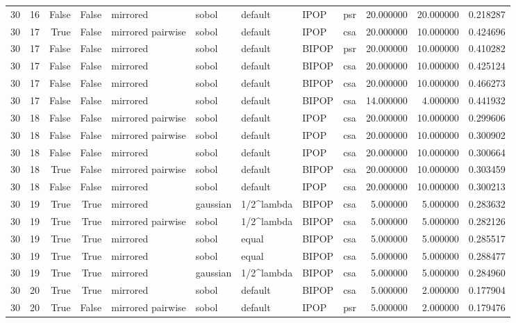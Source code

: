 \begin{tabular}{rrrrlllllrrr}
30 & 16 & False & False & mirrored & sobol & default & IPOP & psr & 20.000000 & 20.000000 & 0.218287 \\
30 & 17 & True & False & mirrored pairwise & sobol & default & IPOP & csa & 20.000000 & 10.000000 & 0.424696 \\
30 & 17 & False & False & mirrored & sobol & default & BIPOP & psr & 20.000000 & 10.000000 & 0.410282 \\
30 & 17 & False & False & mirrored & sobol & default & BIPOP & csa & 20.000000 & 10.000000 & 0.425124 \\
30 & 17 & False & False & mirrored & sobol & default & BIPOP & csa & 20.000000 & 10.000000 & 0.466273 \\
30 & 17 & False & False & mirrored & sobol & default & BIPOP & csa & 14.000000 & 4.000000 & 0.441932 \\
30 & 18 & False & False & mirrored pairwise & sobol & default & IPOP & csa & 20.000000 & 10.000000 & 0.299606 \\
30 & 18 & False & False & mirrored pairwise & sobol & default & IPOP & csa & 20.000000 & 10.000000 & 0.300902 \\
30 & 18 & False & False & mirrored & sobol & default & IPOP & csa & 20.000000 & 10.000000 & 0.300664 \\
30 & 18 & True & False & mirrored pairwise & sobol & default & BIPOP & csa & 20.000000 & 10.000000 & 0.303459 \\
30 & 18 & False & False & mirrored & sobol & default & IPOP & csa & 20.000000 & 10.000000 & 0.300213 \\
30 & 19 & True & True & mirrored & gaussian & 1/2^lambda & BIPOP & csa & 5.000000 & 5.000000 & 0.283632 \\
30 & 19 & True & True & mirrored pairwise & sobol & 1/2^lambda & BIPOP & csa & 5.000000 & 5.000000 & 0.282126 \\
30 & 19 & True & True & mirrored & sobol & equal & BIPOP & csa & 5.000000 & 5.000000 & 0.285517 \\
30 & 19 & True & True & mirrored & sobol & equal & BIPOP & csa & 5.000000 & 5.000000 & 0.288477 \\
30 & 19 & True & True & mirrored & gaussian & 1/2^lambda & BIPOP & csa & 5.000000 & 5.000000 & 0.284960 \\
30 & 20 & True & True & mirrored & sobol & default & BIPOP & csa & 5.000000 & 2.000000 & 0.177904 \\
30 & 20 & True & False & mirrored pairwise & sobol & default & IPOP & psr & 5.000000 & 2.000000 & 0.179476 \\

\end{tabular}

